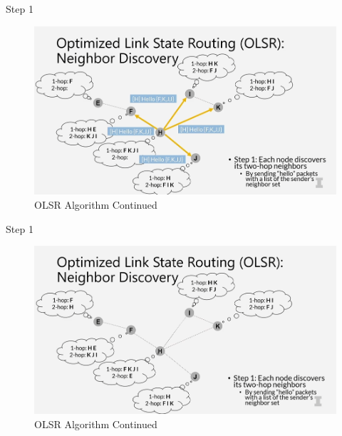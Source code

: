 \documentclass[11pt]{beamer}              %
\begin{document}
\begin{frame}{Step 1}

    \begin{figure}
        \centering
        \includegraphics[width=\textwidth]{figures/olsr7.png}
        \caption{OLSR Algorithm Continued \cite{coursera}}
    \end{figure}    
    
\end{frame}

\begin{frame}{Step 1}

    \begin{figure}
        \centering
        \includegraphics[width=\textwidth]{figures/olsr8.png}
        \caption{OLSR Algorithm Continued \cite{coursera}}
    \end{figure}    
    
\end{frame}
\end{document}
